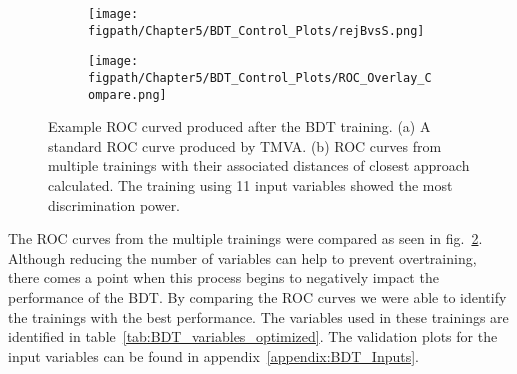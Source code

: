 \begin{figure}[!hbt]
    \centering
    \begin{subfigure}[t]{0.48\textwidth}
        \texttt{[image: \\figpath/Chapter5/BDT\_Control\_Plots/rejBvsS.png]}
        \caption{}
        \label{fig:KinBDT_ROC_Output_Example}
    \end{subfigure}
    \begin{subfigure}[t]{0.48\textwidth}
        \texttt{[image: \\figpath/Chapter5/BDT\_Control\_Plots/ROC\_Overlay\_Compare.png]}
        \caption{}
        \label{fig:KinBDT_ROC_nVarComparison}
    \end{subfigure}
    \caption{Example ROC curved produced after the BDT training. (a) A standard ROC curve produced by TMVA. (b) ROC curves from multiple trainings with their associated distances of closest approach calculated. The training using 11 input variables showed the most discrimination power.}
    \label{fig:KinBDT_ROC_Examples}
\end{figure}

The ROC curves from the multiple trainings were compared as seen in fig.~\ref{fig:KinBDT_ROC_nVarComparison}.
Although reducing the number of variables can help to prevent overtraining, there comes a point when this process begins to negatively impact the performance of the BDT.
By comparing the ROC curves we were able to identify the trainings with the best performance.
The variables used in these trainings are identified in table~\ref{tab:BDT_variables_optimized}.
The validation plots for the input variables can be found in appendix~\ref{appendix:BDT_Inputs}.

